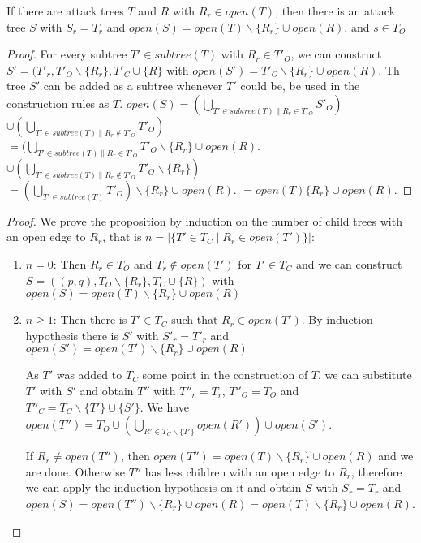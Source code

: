 \begin{lemma}
  \label{lemma:tree-composition}
  If there are attack trees $T$ and $R$ with
  $R_r ∈ open(T)$,
  then there is an attack tree $S$ with
  $S_r = T_r$ and
  $open(S) = open(T) ∖ \{R_r\} ∪ open(R)$.
  and $s ∈ T_O$
\end{lemma}
\begin{proof}
  For every subtree $T' ∈ subtree(T)$
  with $R_r ∈ T'_O$, we can construct
  $S' = (T'_r, T'_O ∖ \{R_r\}, T'_C ∪ \{R\}$ with
  $open(S') = T'_O ∖ \{R_r\} ∪ open(R)$.
  Th tree $S'$ can be added as a subtree whenever $T'$ could be,
  be used in the construction rules as $T$.
  $open(S) = (⋃_{T' ∈ subtree(T) \| R_r ∈ T'_O} S'_O)$
  $ ∪ (⋃_{T' ∈ subtree(T) \| R_r ∉ T'_O} T'_O)$
  $= (⋃_{T' ∈ subtree(T) \| R_r ∈ T'_O} T'_O ∖ \{R_r\} ∪ open(R)$.
  $ ∪ (⋃_{T' ∈ subtree(T) \| R_r ∉ T'_O} T'_O ∖ \{R_r\})$
  $= (⋃_{T' ∈ subtree(T)} T'_O) ∖ \{R_r\} ∪ open(R)$.
  $= open(T) \{R_r\} ∪ open(R)$.
\end{proof}
\begin{proof}
  We prove the proposition by induction on the number of child trees
  with an open edge to $R_r$, that is
  $n = |\{ T' ∈ T_C \mid R_r ∈ open(T')\}|$:
  \begin{enumerate}
    \item $n = 0$:
      Then $R_r ∈ T_O$ and $T_r ∉ open(T')$ for $T' ∈ T_C$
      and we can construct
      $S = ((p,q), T_O ∖ \{R_r\}, T_C ∪ \{R\})$ with
      $open(S) = open(T) ∖ \{R_r\} ∪ open(R)$
    \item $n ≥ 1$:
      Then there is $T' ∈ T_C$ such that $R_r ∈ open(T')$.
      By induction hypothesis there is
      $S'$ with $S'_r = T'_r$ and
      $open(S') = open(T') ∖ \{R_r\} ∪ open(R)$

      As $T'$ was added to $T_C$ some point in the construction of $T$,
      we can substitute $T'$ with $S'$ and obtain
      $T''$ with $T''_r = T_r$, $T''_O = T_O$ and
      $T''_C = T_C ∖ \{T'\} ∪ \{S'\}$.
      We have $open(T'') = T_O ∪ (⋃_{R' ∈ T_C ∖ \{T'\} } open(R')) ∪ open(S')$.

      If $R_r ≠ open(T'')$, then $open(T'') = open(T) ∖ \{R_r\} ∪ open(R)$ and we are done.
      Otherwise $T''$ has less children with an open edge to
      $R_r$, therefore we
      can apply the induction hypothesis on it and obtain
      $S$ with $S_r = T_r$ and
      $open(S) = open(T'') ∖ \{R_r\} ∪ open(R) = open(T) ∖ \{R_r\} ∪ open(R)$.
  \end{enumerate}
\end{proof}

